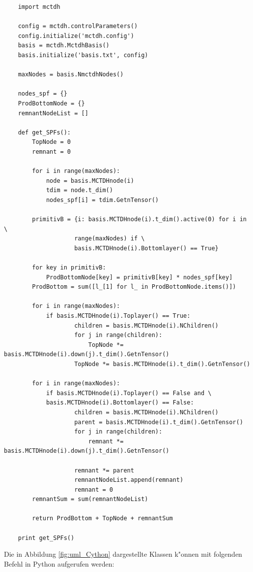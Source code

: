 \begin{verbatim}
    import mctdh

    config = mctdh.controlParameters()
    config.initialize('mctdh.config')
    basis = mctdh.MctdhBasis()
    basis.initialize('basis.txt', config)
    
    maxNodes = basis.NmctdhNodes()
    
    nodes_spf = {}
    ProdBottomNode = {}
    remnantNodeList = []
    
    def get_SPFs():
        TopNode = 0
        remnant = 0
    
        for i in range(maxNodes):
            node = basis.MCTDHnode(i)
            tdim = node.t_dim()
            nodes_spf[i] = tdim.GetnTensor() 
    
        primitivB = {i: basis.MCTDHnode(i).t_dim().active(0) for i in \
                    range(maxNodes) if \
                    basis.MCTDHnode(i).Bottomlayer() == True}
                    
        for key in primitivB:
            ProdBottomNode[key] = primitivB[key] * nodes_spf[key]
        ProdBottom = sum([l_[1] for l_ in ProdBottomNode.items()])
    
        for i in range(maxNodes):
            if basis.MCTDHnode(i).Toplayer() == True:
                    children = basis.MCTDHnode(i).NChildren()
                    for j in range(children):
                        TopNode *= basis.MCTDHnode(i).down(j).t_dim().GetnTensor()
                    TopNode *= basis.MCTDHnode(i).t_dim().GetnTensor()
    
        for i in range(maxNodes):
            if basis.MCTDHnode(i).Toplayer() == False and \
            basis.MCTDHnode(i).Bottomlayer() == False:
                    children = basis.MCTDHnode(i).NChildren()
                    parent = basis.MCTDHnode(i).t_dim().GetnTensor()
                    for j in range(children):
                        remnant *= basis.MCTDHnode(i).down(j).t_dim().GetnTensor() 
                        
                    remnant *= parent
                    remnantNodeList.append(remnant)
                    remnant = 0
        remnantSum = sum(remnantNodeList)
    
        return ProdBottom + TopNode + remnantSum
    
    print get_SPFs()
\end{verbatim}


Die in Abbildung \ref{fig:uml_Cython} dargestellte Klassen k"onnen mit folgenden Befehl in Python aufgerufen werden:

